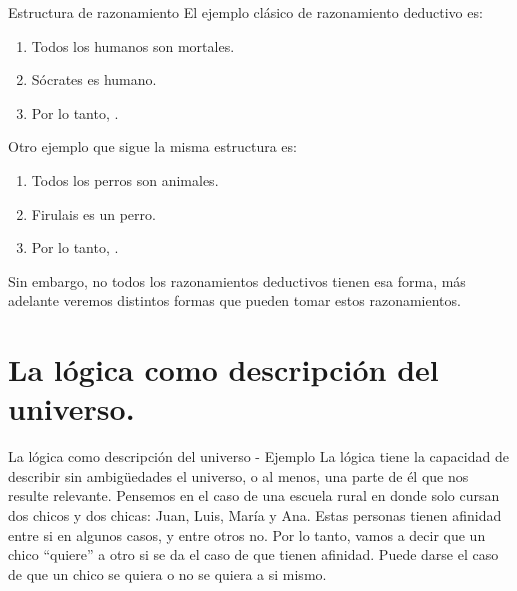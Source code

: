 
\begin{frame}{Estructura de razonamiento}
  El ejemplo clásico de razonamiento deductivo es:
  \begin{enumerate}
    \item Todos los humanos son mortales.
    \item Sócrates es humano.
    \item Por lo tanto, .
  \end{enumerate}
  \jump
  Otro ejemplo que sigue la misma estructura es:
  \begin{enumerate}
    \item Todos los perros son animales.
    \item Firulais es un perro.
    \item Por lo tanto, .
  \end{enumerate}
  \jump
  Sin embargo, no todos los razonamientos deductivos tienen esa forma,
  más adelante veremos distintos formas que pueden tomar estos razonamientos.
\end{frame}


\section{La lógica como descripción del universo.}


\begin{frame}{La lógica como descripción del universo - Ejemplo}
  La lógica tiene la capacidad de describir sin ambigüedades el universo,
  o al menos, una parte de él que nos resulte relevante.
  \jump
  Pensemos en el caso de una escuela rural en donde solo cursan dos chicos y
  dos chicas: Juan, Luis, María y Ana.
  \jump
  Estas personas tienen afinidad entre si en algunos casos, y entre otros no.
  Por lo tanto, vamos a decir que un chico ``quiere'' a otro si se da el caso de que
  tienen afinidad. Puede darse el caso de que un chico se quiera o no se quiera
  a si mismo.
\end{frame}


